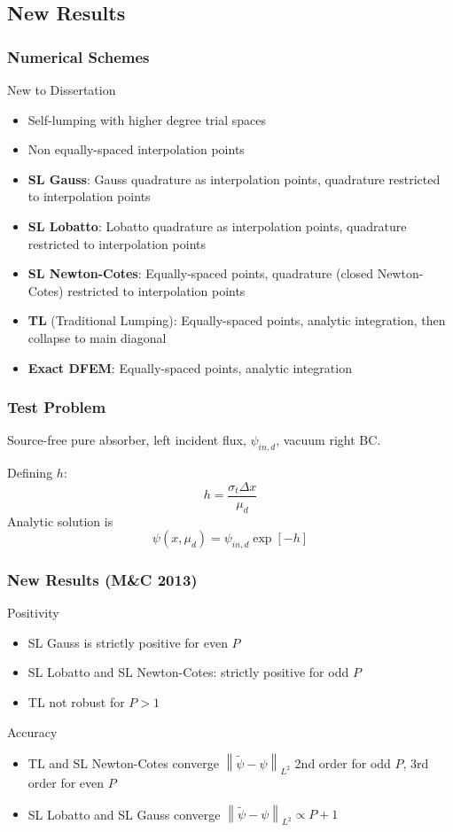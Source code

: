 \documentclass{beamer}
\newcommand{\be}{\begin{equation*}}   %
\newcommand{\ee}{\end{equation*}}
\newcommand{\norm}[1]{\ensuremath{\left\lVert #1 \right\rVert}}  %
\begin{document}
\subsection{New  Results}
\begin{frame}
\frametitle{Numerical Schemes}
\begin{block}{New to Dissertation}
\begin{small}
\begin{itemize} 
\item Self-lumping with higher degree trial spaces
\item Non equally-spaced interpolation points
\end{itemize}
\end{small}
\end{block}
\begin{itemize}
\item {\bf SL Gauss}: Gauss quadrature as interpolation points, quadrature restricted to interpolation points
\item {\bf SL Lobatto}: Lobatto quadrature as interpolation points, quadrature restricted to interpolation points
\item {\bf SL Newton-Cotes}: Equally-spaced points, quadrature (closed Newton-Cotes) restricted to interpolation points
\item {\bf TL} (Traditional Lumping): Equally-spaced points, analytic integration, then collapse to main diagonal
\item {\bf Exact DFEM}: Equally-spaced points, analytic integration
\end{itemize}
\end{frame}

\begin{frame}
\frametitle{Test Problem}
Source-free pure absorber, left incident flux, $\psi_{in,d}$, vacuum right BC.

Defining $h$:
\be
h = \frac{\sigma_t \Delta x}{\mu_d}
\ee
Analytic solution is
\be
\psi(x,\mu_d) = \psi_{in,d} \exp[-h]
\ee

\end{frame}

\begin{frame}
\frametitle{New Results (M\&C 2013)}
Positivity
\begin{itemize}
\item SL Gauss is strictly positive for even $P$
\item SL Lobatto and SL Newton-Cotes: strictly positive for odd $P$
\item TL not robust for $P>1$
\end{itemize}
Accuracy
\begin{itemize}
\item TL and SL Newton-Cotes converge $\norm{ \widetilde{\psi} - \psi }_{L^2} $ 2nd order for odd $P$, 3rd order for even $P$
\item SL Lobatto and SL Gauss converge $\norm{ \widetilde{\psi} - \psi }_{L^2} \propto P+1$
\end{itemize}
\end{frame}
\end{document}
